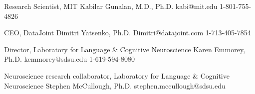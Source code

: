

\begin{cventries}

  \iffalse %
  \cventry %
    {Smallcaps}
    {Bold}
    {Purple}
    {below purple} %
    {
      \begin{cvitems}
        \item {Description(s) bullet points}
      \end{cvitems}
    }
  \fi

  \cventry 
    {Research Scientist, MIT} %
    {Kabilar Gunalan, M.D., Ph.D.} %
    {kabi@mit.edu} %
    {1-801-755-4826} %
    {}

  \cventry 
  {CEO, DataJoint} %
  {Dimitri Yatsenko, Ph.D.} %
  {Dimitri@datajoint.com} %
  {1-713-405-7854} %
  {}

  \cventry 
    {Director, Laboratory for Language \& Cognitive Neuroscience} %
    {Karen Emmorey, Ph.D.} %
    {kemmorey@sdsu.edu} %
    {1-619-594-8080} %
    {} 

  \cventry 
    {Neuroscience research collaborator, Laboratory for Language \& Cognitive Neuroscience} %
    {Stephen McCullough, Ph.D.} %
    {stephen.mccullough@sdsu.edu} %
    {} %
    {}
\end{cventries}
